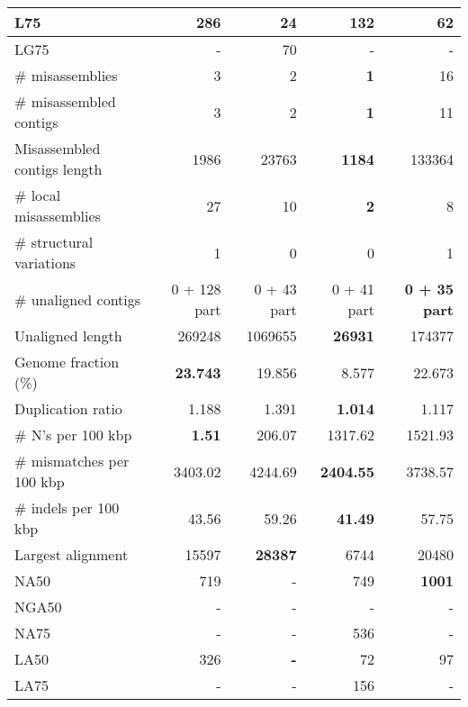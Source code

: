 \documentclass[12pt,a4paper]{article}
\begin{document}
\begin{table}[ht]
\begin{center}
\begin{tabular}{|l*{4}{|r}|}
L75 & 286 & {\bf 24} & 132 & 62 \\ \hline
LG75 & - & 70 & - & - \\ \hline
\# misassemblies & 3 & 2 & {\bf 1} & 16 \\ \hline
\# misassembled contigs & 3 & 2 & {\bf 1} & 11 \\ \hline
Misassembled contigs length & 1986 & 23763 & {\bf 1184} & 133364 \\ \hline
\# local misassemblies & 27 & 10 & {\bf 2} & 8 \\ \hline
\# structural variations & 1 & 0 & 0 & 1 \\ \hline
\# unaligned contigs & 0 + 128 part & 0 + 43 part & 0 + 41 part & {\bf 0 + 35 part} \\ \hline
Unaligned length & 269248 & 1069655 & {\bf 26931} & 174377 \\ \hline
Genome fraction (\%) & {\bf 23.743} & 19.856 & 8.577 & 22.673 \\ \hline
Duplication ratio & 1.188 & 1.391 & {\bf 1.014} & 1.117 \\ \hline
\# N's per 100 kbp & {\bf 1.51} & 206.07 & 1317.62 & 1521.93 \\ \hline
\# mismatches per 100 kbp & 3403.02 & 4244.69 & {\bf 2404.55} & 3738.57 \\ \hline
\# indels per 100 kbp & 43.56 & 59.26 & {\bf 41.49} & 57.75 \\ \hline
Largest alignment & 15597 & {\bf 28387} & 6744 & 20480 \\ \hline
NA50 & 719 & - & 749 & {\bf 1001} \\ \hline
NGA50 & - & - & - & - \\ \hline
NA75 & - & - & 536 & - \\ \hline
LA50 & 326 & {\bf -} & 72 & 97 \\ \hline
LA75 & - & - & 156 & - \\ \hline
\end{tabular}
\end{center}
\end{table}
\end{document}

